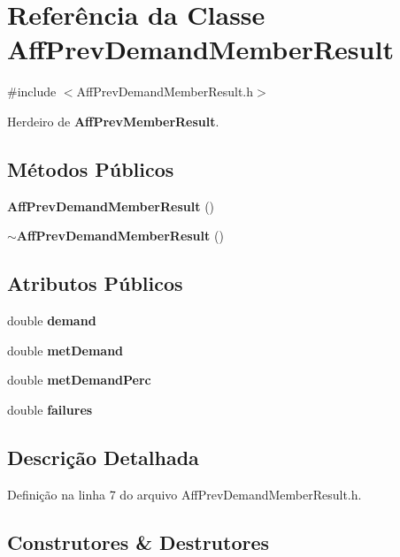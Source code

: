 \section{Referência da Classe Aff\+Prev\+Demand\+Member\+Result}
\label{class_aff_prev_demand_member_result}


{\ttfamily \#include $<$Aff\+Prev\+Demand\+Member\+Result.\+h$>$}



Herdeiro de {\bf Aff\+Prev\+Member\+Result}.

\subsection*{Métodos Públicos}
\begin{DoxyCompactItemize}
\item 
{\bf Aff\+Prev\+Demand\+Member\+Result} ()
\item 
{\bf $\sim$\+Aff\+Prev\+Demand\+Member\+Result} ()
\end{DoxyCompactItemize}
\subsection*{Atributos Públicos}
\begin{DoxyCompactItemize}
\item 
double {\bf demand}
\item 
double {\bf met\+Demand}
\item 
double {\bf met\+Demand\+Perc}
\item 
double {\bf failures}
\end{DoxyCompactItemize}


\subsection{Descrição Detalhada}


Definição na linha 7 do arquivo Aff\+Prev\+Demand\+Member\+Result.\+h.



\subsection{Construtores \& Destrutores}
